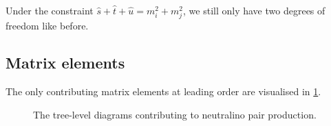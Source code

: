 \documentclass[english,notitlepage]{article}
\begin{document}
    Under the constraint \(\hat{s} + \hat{t} + \hat{u} = m_i^2 + m_j^2\), we still only have two degrees of freedom like before.

\subsection{Matrix elements}
    The only contributing matrix elements at leading order are visualised in \cref{fig:tree_level_diagrams}.

    \begin{figure} [ht!]
        \centering
        \caption{The tree-level diagrams contributing to neutralino pair production.}
        \label{fig:tree_level_diagrams}
    \end{figure}
\end{document}
